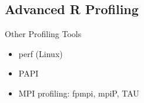 \subsection{Advanced R Profiling}
\makesubcontentsslidessec

\begin{frame}
  \begin{block}{Other Profiling Tools}
    \begin{itemize}
      \item perf (Linux)
      \item PAPI
      \item MPI profiling: fpmpi, mpiP, TAU
    \end{itemize}
  \end{block}
\end{frame}



